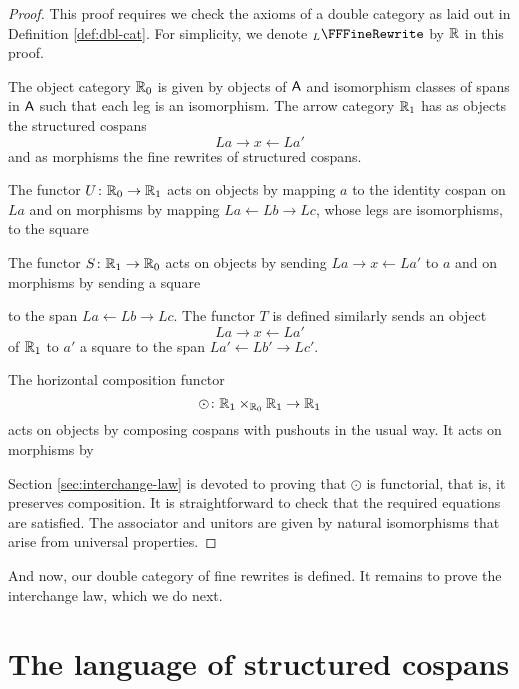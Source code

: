 \documentclass{amsart}
\begin{document}
\begin{proof}
  This proof requires we check the axioms of a double
  category as laid out in Definition \ref{def:dbl-cat}. For
  simplicity, we denote $_L\FFFineRewrite$ by $\mathbb{R} $ in
  this proof.

  The object category $\mathbb{R}_0$ is given by objects of $\mathsf{A}$
  and isomorphism classes of spans in $\mathsf{A}$ such that each
  leg is an isomorphism.  The arrow category $\mathbb{R}_1$ has as
  objects the structured cospans
  \[
    La \to x \gets La'
  \]
  and as morphisms the fine rewrites of structured cospans.
	
  The functor $U \colon \mathbb{R}_0 \to \mathbb{R}_1$ acts on objects by
  mapping $a$ to the identity cospan on $La$ and on
  morphisms by mapping $La \gets Lb \to Lc$, whose legs are
  isomorphisms, to the square
  
  
  The functor $S \colon \mathbb{R}_1 \to \mathbb{R}_0$ acts on objects by
  sending $La \to x \gets La'$ to $a$ and on morphisms by
  sending a square 
  
  to the span $ La \gets Lb \to Lc $. The functor $T$ is
  defined similarly sends an object \[ La \to x \gets La' \]
  of $ \mathbb{R}_1 $ to $ a' $ a square
   to the span
  $ La' \gets Lb' \to Lc' $.
  
  The horizontal composition functor
  \[
    \odot \colon \mathbb{R}_1 \times_{\mathbb{R}_0} \mathbb{R}_1 \to
    \mathbb{R}_1
  \]
  acts on objects by composing cospans with pushouts in the
  usual way.  It acts on morphisms by
  
  
  Section \ref{sec:interchange-law} is devoted to proving
  that $\odot$ is functorial, that is, it preserves
  composition.  It is straightforward to check that the
  required equations are satisfied.  The associator and
  unitors are given by natural isomorphisms that arise from
  universal properties.
\end{proof}

And now, our double category of fine rewrites is defined. It
remains to prove the interchange law, which we do next.

\section{The language of structured cospans}
\label{sec:structural-induction}
\end{document}
